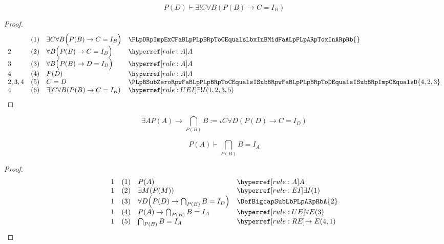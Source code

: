 \documentclass[main.tex]{subfiles}
\begin{document}
\begin{theorem}[ ]
\label{PLpDRpImpExonlyoneCFaBLpPLpBRpToCEqualsISubBRp}
\[P(D)\vdash \exists! C\forall B(P(B)\rightarrow C=I_B)\]
\end{theorem}
\begin{proof}
\[
\begin{array}{llll}
 & (1) & \exists C\forall B\Bigl(P(B)\rightarrow C=I_B\Bigr) & \PLpDRpImpExCFaBLpPLpBRpToCEqualsLbxInBMidFaALpPLpARpToxInARpRb{} \\	
2 & (2) & \forall B\Bigl(P(B)\rightarrow C=I_B\Bigr) & \rA \\
3 & (3) & \forall B\Bigl(P(B)\rightarrow D=I_B\Bigr) & \rA \\
4 & (4) & P(D) & \rA \\
2,3,4 & (5) & C=D & \PLpBSubZeroRpwFaBLpPLpBRpToCEqualsISubBRpwFaBLpPLpBRpToDEqualsISubBRpImpCEqualsD{4,2,3} \\
4 & (6) & \exists! C\forall B(P(B)\rightarrow C=I_B) & \UEI{1,2,3,5} \\
\end{array}
\]
\end{proof}


\begin{definition}
\label{DefBigcapSubLbPLpARpRbA}
\[\exists A P(A)\rightarrow \bigcap_{P(B)} B:= \iota C\forall D(P(D)\rightarrow C=I_D)\]
\end{definition}


\begin{theorem}[ ]
\label{PLpARpImpBigcapSubLbPLpBRpRbBEqualsISubA}
\[P(A)\vdash \bigcap_{P(B)} B = I_A\]
\end{theorem}
\begin{proof}
\[
\begin{array}{llll}
1 & (1) & P(A)  & \rA \\	
1 & (2) & \exists M(P(M)) & \rEI{1}  \\	
1 & (3) & \forall D\Bigr(P(D)\rightarrow \bigcap_{P(B)} B=I_D\Bigl)  & \DefBigcapSubLbPLpARpRbA{2}  \\	
1 & (4) & P(A)\rightarrow \bigcap_{P(B)} B=I_A  & \rUE{3}  \\
1 & (5) & \bigcap_{P(B)} B=I_A  & \rRE{4,1}  \\
\end{array}
\]
\end{proof}
\end{document}

